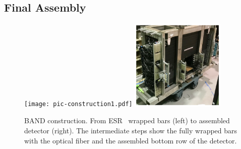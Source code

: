 \documentclass[3p,final,twocolumn]{elsarticle}
\begin{document}
\subsection{Final Assembly}
\label{sec:assembly}
\begin{figure}[tbp]
	\centering
	\texttt{[image: pic-construction1.pdf]}
	\includegraphics[width=0.40\textwidth , height=0.40\textwidth]{pic-construction2.pdf}
				\caption{BAND construction. From ESR~\cite{3MESR} wrapped bars (left) to assembled detector (right). The intermediate steps show the fully wrapped bars with the optical fiber and the assembled bottom row of the detector.}
		\label{fig:barassembly}
\end{figure}
\end{document}
